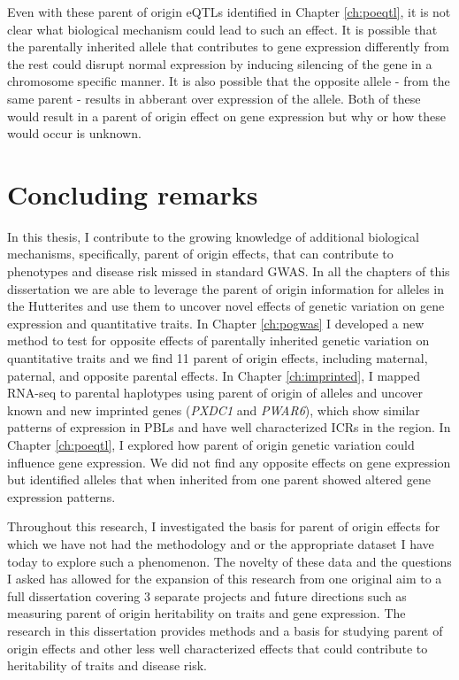 Even with these parent of origin eQTLs identified in Chapter \ref{ch:poeqtl}, it is not clear what biological mechanism could lead to such an effect. It is possible that the parentally inherited allele that contributes to gene expression differently from the rest could disrupt normal expression by inducing silencing of the gene in a chromosome specific manner. It is also possible that the opposite allele - from the same parent - results in abberant over expression of the allele. Both of these would result in a parent of origin effect on gene expression but why or how these would occur is unknown. 

\section{Concluding remarks}

In this thesis, I contribute to the growing knowledge of additional biological mechanisms, specifically, parent of origin effects, that can contribute to phenotypes and disease risk missed in standard GWAS. In all the chapters of this dissertation we are able to leverage the parent of origin information for alleles in the Hutterites and use them to uncover novel effects of genetic variation on gene expression and quantitative traits. In Chapter \ref{ch:pogwas} I developed a new method to test for opposite effects of parentally inherited genetic variation on quantitative traits and we find 11 parent of origin effects, including maternal, paternal, and opposite parental effects. In Chapter \ref{ch:imprinted}, I mapped RNA-seq to parental haplotypes using parent of origin of alleles and uncover known and new imprinted genes (\emph{PXDC1} and \emph{PWAR6}), which show similar patterns of expression in PBLs and have well characterized ICRs in the region. In Chapter \ref{ch:poeqtl}, I explored how parent of origin genetic variation could influence gene expression. We did not find any opposite effects on gene expression but identified alleles that when inherited from one parent showed altered gene expression patterns. 

Throughout this research, I investigated the basis for parent of origin effects for which we have not had the methodology and or the appropriate dataset I have today to explore such a phenomenon. The novelty of these data and the questions I asked  has allowed for the expansion of this research from one original aim to a full dissertation covering 3 separate projects and future directions such as measuring parent of origin heritability on traits and gene expression. The research in this dissertation provides methods and a basis for studying parent of origin effects and other less well characterized effects that could contribute to heritability of traits and disease risk. 




